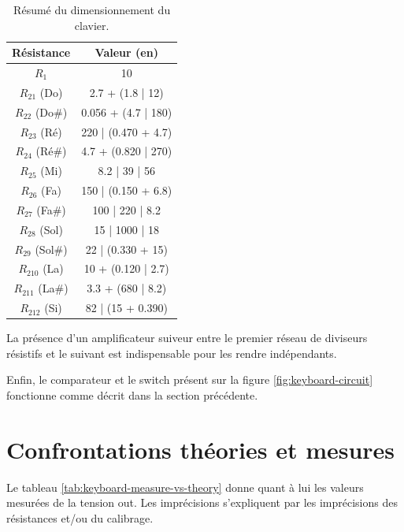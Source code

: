 \begin{table}[ht]
	\centering
		\begin{tabular}{|c|c|}
			\hline
				Résistance & Valeur (en\unit{}{\kilo\ohm}) \\
			\hline
				$R_1$ & 10 \\
			\hline
				$R_{21}$ (Do) & 2.7 + (1.8 | 12) \\
			\hline
				$R_{22}$ (Do\#) & 0.056 + (4.7 | 180) \\
			\hline
				$R_{23}$ (Ré) & 220 | (0.470 + 4.7) \\
			\hline
				$R_{24}$ (Ré\#) & 4.7 + (0.820 | 270) \\
			\hline
				$R_{25}$ (Mi) & 8.2 | 39 | 56 \\
			\hline
				$R_{26}$ (Fa) & 150 | (0.150 + 6.8)\\
			\hline
				$R_{27}$ (Fa\#) & 100 | 220 | 8.2 \\
			\hline
				$R_{28}$ (Sol) & 15 | 1000 | 18 \\
			\hline
				$R_{29}$ (Sol\#) & 22 | (0.330 + 15) \\
			\hline
				$R_{210}$ (La) & 10 + (0.120 | 2.7)\\
			\hline
				$R_{211}$ (La\#) & 3.3 + (680 | 8.2)\\
			\hline
				$R_{212}$ (Si) & 82 | (15 + 0.390)\\
			\hline
		\end{tabular}
	\caption{Résumé du dimensionnement du clavier.}
	\label{tab:keyboard-dim}
\end{table}

La présence d'un amplificateur suiveur entre le premier
réseau de diviseurs résistifs et le suivant est indispensable
pour les rendre indépendants.

Enfin, le comparateur et le switch présent sur la figure
\ref{fig:keyboard-circuit} fonctionne comme décrit dans la
section précédente.

\section{Confrontations théories et mesures}
Le tableau \ref{tab:keyboard-measure-vs-theory} donne quant
à lui les valeurs mesurées de la tension out. Les imprécisions
s'expliquent par les imprécisions des résistances et/ou du
calibrage.


